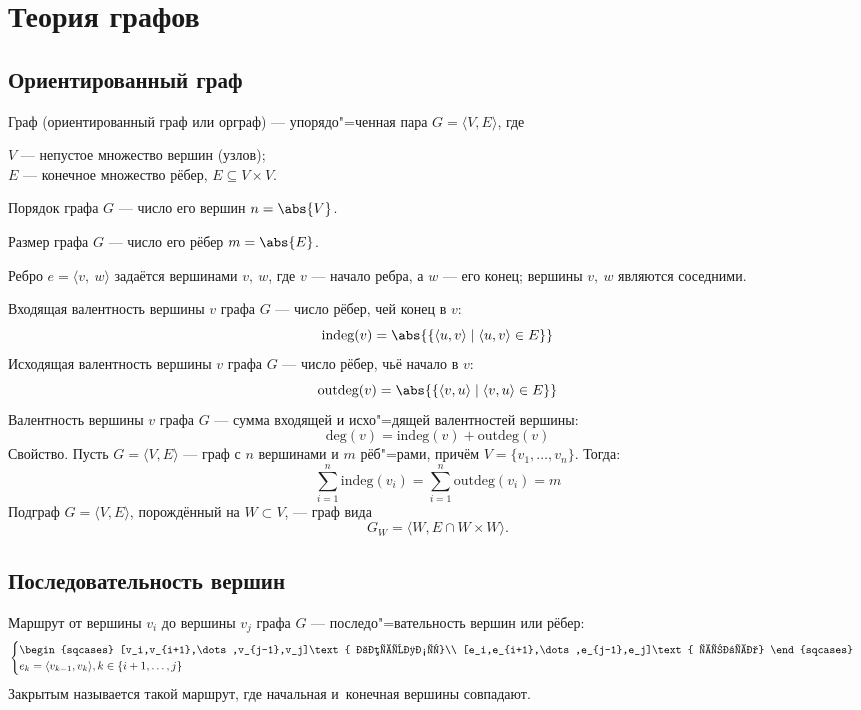\section{Теория графов}

\subsection{Ориентированный граф}

{\bold Граф} {\ital (ориентированный граф или орграф)} --- упорядо"=ченная пара $G=\langle V,E\rangle$, где

$V$ --- непустое множество {\ital вершин {\color{desc}(узлов)}};\\
$E$ --- конечное множество {\ital рёбер}, $E\subseteq V\times V$.

{\ital Порядок} графа $G$ --- число его вершин $n=\abs{V}$.

{\ital Размер} графа $G$ --- число его рёбер $m=\abs{E}$.

Ребро $e=\langle v,\ w\rangle$ задаётся вершинами $v,\ w$, где $v$ --- начало ребра, а $w$ --- его конец; вершины $v,\ w$ являются {\ital соседними}.

{\ital Входящая валентность} вершины $v$ графа $G$ --- число рёбер, чей конец в $v$:
$$\text{indeg}(v)=\abs{\{\langle u,v\rangle\mid\langle u,v\rangle\in E\}}$$
{\ital Исходящая валентность} вершины $v$ графа $G$ --- число рёбер, чьё начало в $v$:
$$\text{outdeg}(v)=\abs{\{\langle v,u\rangle\mid\langle v,u\rangle\in E\}}$$
{\ital Валентность} вершины $v$ графа $G$ --- сумма входящей и исхо"=дящей валентностей вершины:
$$\text{deg}(v)=\text{indeg}(v)+\text{outdeg}(v)$$
{\ital Свойство.} Пусть $G=\langle V,E\rangle$ --- граф с $n$ вершинами и $m$ рёб"=рами, причём $V=\{v_1,\dots,v_n\}$. Тогда:
$$\sum_{i=1}^{n}\text{indeg}(v_i)=\sum_{i=1}^{n}\text{outdeg}(v_i)=m$$
{\ital Подграф} $G=\langle V,E\rangle$, {\ital порождённый} на $W\subset V$, --- граф вида
$$G_W=\langle W,E\cap W\times W\rangle.$$

\newpage
\subsection{Последовательность вершин}

{\ital Маршрут} от вершины $v_i$ до вершины $v_j$ графа $G$ --- последо"=вательность вершин или рёбер:
$$\begin{cases}
\begin{sqcases}
[v_i,v_{i+1},\dots,v_{j-1},v_j]\text{ вершины}\\
[e_i,e_{i+1},\dots,e_{j-1},e_j]\text{ рёбра}
\end{sqcases}\\
e_k=\langle v_{k-1},v_k\rangle,k\in\{i+1,\dots,j\}
\end{cases}$$
{\ital Закрытым} называется такой маршрут, где начальная и~конечная вершины совпадают.

